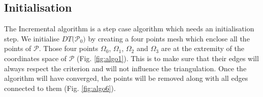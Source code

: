 \documentclass{InsightArticle}
\begin{document}
\begin{figure}
\label{fig:inheritance}
\end{figure}

\subsection{Initialisation}

The Incremental algorithm is a step case algorithm which needs an initialisation step. We initialise $\mathit{DT(}\mathcal{P}_{0}\mathit{)}$ by creating a four points mesh which enclose all the points of $\mathcal{P}$. Those four points $\Omega_{0}$, $\Omega_{1}$, $\Omega_{2}$ and $\Omega_{3}$ are at the extremity of the coordinates space of $\mathcal{P}$ (Fig. \ref{fig:algo1}). This is to make sure that their edges will always respect the criterion and will not influence the triangulation. Once the algorithm will have converged, the points will be removed along with all edges connected to them (Fig. \ref{fig:algo6}).
\end{document}
